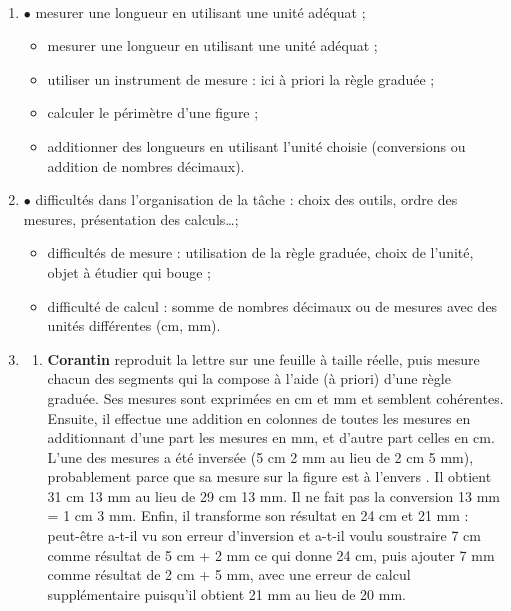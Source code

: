 {\begin{corrige}
\ \\ [-5mm]
\begin{enumerate}
   \item \textcolor{A1}{$\bullet$} mesurer une longueur en utilisant une unité adéquat ;
   \begin{itemize}
      \item mesurer une longueur en utilisant une unité adéquat ;
      \item utiliser un instrument de mesure : ici à priori la règle graduée ;
      \item calculer le périmètre d'une figure ;
      \item additionner des longueurs en utilisant l'unité choisie (conversions ou addition de nombres décimaux).
   \end{itemize}
   \item \textcolor{A1}{$\bullet$} difficultés dans l'organisation de la tâche : choix des outils, ordre des mesures, présentation des calculs\dots ;
   \begin{itemize}
      \item difficultés de mesure : utilisation de la règle graduée, choix de l'unité, objet à étudier \og qui bouge \fg ;
      \item difficulté de calcul : somme de nombres décimaux ou de mesures avec des unités différentes (cm, mm).
   \end{itemize}
   \item 
   \begin{enumerate}
      \item {\bf Corantin} reproduit la lettre sur une feuille à taille réelle, puis mesure chacun des segments qui la compose à l'aide (à priori) d'une règle graduée. Ses mesures sont exprimées en cm et mm et semblent cohérentes. Ensuite, il effectue une addition en colonnes de toutes les mesures en additionnant d'une part les mesures en mm, et d'autre part celles en cm. L'une des mesures a été inversée (5 cm 2 mm au lieu de 2 cm 5 mm), probablement parce que sa mesure sur la figure est \og à l'envers \fg{}. Il obtient 31 cm 13 mm au lieu de 29 cm 13 mm. Il ne fait pas la conversion 13 mm = 1 cm 3 mm. Enfin, il transforme son résultat en 24 cm et 21 mm : peut-être a-t-il vu son erreur d'inversion et a-t-il voulu soustraire 7 cm comme résultat de 5 cm + 2 mm ce qui donne 24 cm, puis ajouter 7 mm comme résultat de 2 cm + 5 mm, avec une erreur de calcul supplémentaire puisqu'il obtient 21 mm au lieu de 20 mm. \\

\end{enumerate}
\end{enumerate}
\end{corrige}}
